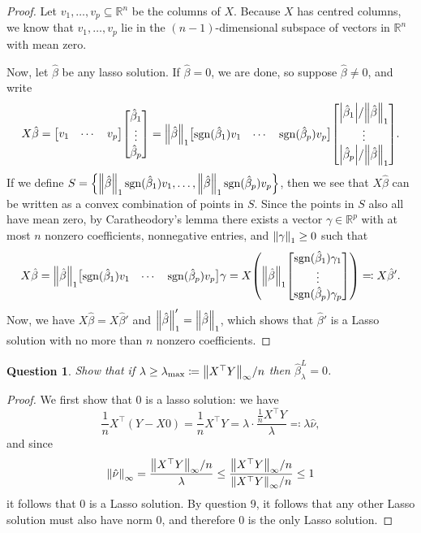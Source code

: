 \documentclass{article}
\theoremstyle{plain}
\newtheorem{question}{Question}
\theoremstyle{remark}
\newcommand{\Bb}{\mathbb}
\newcommand{\Rm}{\mathrm}
\newcommand{\RR}{\Bb R}
\newcommand{\T}{^\top} %
\newcommand\ceq\coloneqq %
\DeclareMathOperator{\sign}{sgn}
\begin{document}
\begin{proof}
	Let $v_1, \dotsc, v_p \subseteq \RR^n$ be the columns of $X$. Because $X$ has centred columns, we know that $v_1, \dotsc, v_p$ lie in the $(n-1)$-dimensional subspace of vectors in $\RR^n$ with mean zero. 
	
	Now, let $\hat\beta$ be any lasso solution. If $\hat\beta = 0$, we are done, so suppose $\hat\beta \neq 0$, and write
	\[
	X\hat\beta = \mqty[ v_1 & \dotsb & v_p] \mqty[ \hat\beta_1 \\ \vdots \\ \hat\beta_p] = \norm{\hat\beta}_1 \mqty[\sign(\hat\beta_1) v_1 & \dotsb & \sign(\hat\beta_p) v_p] \mqty[ \abs{\hat\beta_1} / \norm{\hat\beta}_1\\ \vdots \\ \abs{\hat\beta_p}/\norm{\hat\beta}_1].
	\]
	If we define $S = \qty{\norm{\hat\beta}_1 \sign(\hat\beta_1)v_1, \dotsc, \norm{\hat\beta}_1 \sign(\hat\beta_p)v_p}$, then we see that $X\hat\beta$ can be written as a convex combination of points in $S$. Since the points in $S$ also all have mean zero, by Caratheodory's lemma there exists a vector $\gamma \in \RR^p$ with at most $n$ nonzero coefficients, nonnegative entries, and $\norm{\gamma}_1 \geq 0$ such that
	\[
	X\hat\beta = \norm{\hat\beta}_1 \mqty[\sign(\hat\beta_1) v_1 & \dotsb & \sign(\hat\beta_p) v_p] \gamma = X \qty(\norm{\hat\beta}_1 \mqty[\sign(\hat\beta_1) \gamma_1 \\ \vdots \\ \sign(\hat\beta_p) \gamma_p]) \eqqcolon X\hat\beta'. 
	\]
	Now, we have $X\hat\beta = X\hat\beta'$ and $\norm{\hat\beta}'_1 = \norm{\hat\beta}_1$, which shows that $\hat\beta'$ is a Lasso solution with no more than $n$ nonzero coefficients. 
\end{proof}

\begin{question}
	Show that if $\lambda \geq \lambda_\Rm{max} \ceq \norm{X\T Y}_\infty / n$ then $\hat\beta_\lambda^L = 0$. 
\end{question}

\begin{proof}
	We first show that 0 is a lasso solution: we have
	\[
	\frac1n X\T (Y - X0) = \frac1n X\T Y = \lambda \cdot \frac{\frac1n X\T Y}{\lambda} \eqqcolon \lambda\hat\nu, 
	\]
	and since 
	\[
	\norm{\hat\nu}_\infty = \frac{\norm{X\T Y}_\infty / n}{\lambda} \leq \frac{\norm{X\T Y}_\infty / n}{\norm{X\T Y}_\infty /n} \leq 1
	\]
	it follows that 0 is a Lasso solution. By question 9, it follows that any other Lasso solution must also have norm 0, and therefore 0 is the only Lasso solution. 
%	
\end{proof}
\end{document}
